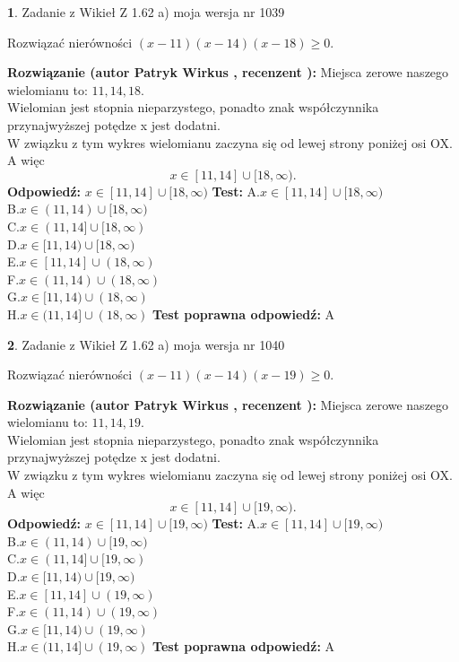 \documentclass[12pt, a4paper]{article}
\theoremstyle{definition} %
\newtheorem{zad}{}
\newcommand{\zadStart}[1]{\begin{zad}#1\newline}
\newcommand{\zadStop}{\end{zad}}
\newcommand{\rozwStart}[2]{\noindent \textbf{Rozwiązanie (autor #1 , recenzent #2): }\newline}
\newcommand{\rozwStop}{\newline}
\newcommand{\odpStart}{\noindent \textbf{Odpowiedź:}\newline}
\newcommand{\odpStop}{\newline}
\newcommand{\testStart}{\noindent \textbf{Test:}\newline}
\newcommand{\testStop}{\newline}
\newcommand{\kluczStart}{\noindent \textbf{Test poprawna odpowiedź:}\newline}
\newcommand{\kluczStop}{\newline}
\begin{document}
\zadStart{Zadanie z Wikieł Z 1.62 a) moja wersja nr 1039}

Rozwiązać nierówności $(x-11)(x-14)(x-18)\ge0$.
\zadStop
\rozwStart{Patryk Wirkus}{}
Miejsca zerowe naszego wielomianu to: $11, 14, 18$.\\
Wielomian jest stopnia nieparzystego, ponadto znak współczynnika przy\linebreak najwyższej potędze x jest dodatni.\\ W związku z tym wykres wielomianu zaczyna się od lewej strony poniżej osi OX. A więc $$x \in [11,14] \cup [18,\infty).$$
\rozwStop
\odpStart
$x \in [11,14] \cup [18,\infty)$
\odpStop
\testStart
A.$x \in [11,14] \cup [18,\infty)$\\
B.$x \in (11,14) \cup [18,\infty)$\\
C.$x \in (11,14] \cup [18,\infty)$\\
D.$x \in [11,14) \cup [18,\infty)$\\
E.$x \in [11,14] \cup (18,\infty)$\\
F.$x \in (11,14) \cup (18,\infty)$\\
G.$x \in [11,14) \cup (18,\infty)$\\
H.$x \in (11,14] \cup (18,\infty)$
\testStop
\kluczStart
A
\kluczStop



\zadStart{Zadanie z Wikieł Z 1.62 a) moja wersja nr 1040}

Rozwiązać nierówności $(x-11)(x-14)(x-19)\ge0$.
\zadStop
\rozwStart{Patryk Wirkus}{}
Miejsca zerowe naszego wielomianu to: $11, 14, 19$.\\
Wielomian jest stopnia nieparzystego, ponadto znak współczynnika przy\linebreak najwyższej potędze x jest dodatni.\\ W związku z tym wykres wielomianu zaczyna się od lewej strony poniżej osi OX. A więc $$x \in [11,14] \cup [19,\infty).$$
\rozwStop
\odpStart
$x \in [11,14] \cup [19,\infty)$
\odpStop
\testStart
A.$x \in [11,14] \cup [19,\infty)$\\
B.$x \in (11,14) \cup [19,\infty)$\\
C.$x \in (11,14] \cup [19,\infty)$\\
D.$x \in [11,14) \cup [19,\infty)$\\
E.$x \in [11,14] \cup (19,\infty)$\\
F.$x \in (11,14) \cup (19,\infty)$\\
G.$x \in [11,14) \cup (19,\infty)$\\
H.$x \in (11,14] \cup (19,\infty)$
\testStop
\kluczStart
A
\kluczStop
\end{document}
